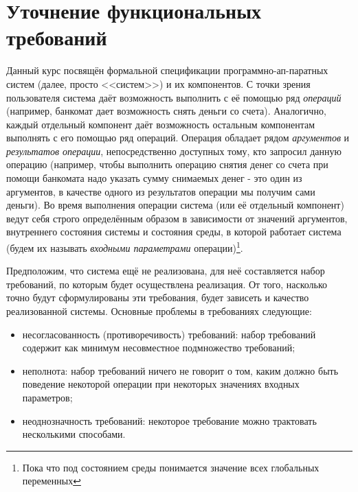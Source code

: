 \documentclass[14pt, twoside]{extreport}
\begin{document}
\chapter{Уточнение функциональных требований}



Данный курс посвящён формальной спецификации программно-ап-паратных систем (далее, просто <<систем>>) и их компонентов. С точки зрения пользователя система даёт возможность выполнить с её помощью ряд \emph{операций} (например, банкомат дает возможность снять деньги со счета). Аналогично, каждый отдельный компонент даёт возможность остальным компонентам выполнять с его помощью ряд операций. Операция обладает рядом \emph{аргументов} и \emph{результатов операции}, непосредственно доступных тому, кто запросил данную операцию (например, чтобы выполнить операцию снятия денег со счета при помощи банкомата надо указать сумму снимаемых денег - это один из аргументов, в качестве одного из результатов операции мы получим сами деньги). Во время выполнения операции система (или её отдельный компонент) ведут себя строго определённым образом в зависимости от значений аргументов, внутреннего состояния системы и состояния среды, в которой работает система (будем их называть \emph{входными параметрами} операции)\footnote{Пока что под состоянием среды понимается значение всех глобальных переменных}.

Предположим, что система ещё не реализована, для неё составляется набор требований, по которым будет осуществлена реализация. От того, насколько точно будут сформулированы эти требования, будет зависеть и качество реализованной системы. Основные проблемы в требованиях следующие:
\begin{itemize}
  \item несогласованность (противоречивость) требований: набор требований содержит как минимум несовместное подмножество требований;
  \item неполнота: набор требований ничего не говорит о том, каким должно быть поведение некоторой операции при некоторых значениях входных параметров;
  \item неоднозначность требований: некоторое требование можно трактовать несколькими способами.
\end{itemize}
\end{document}
